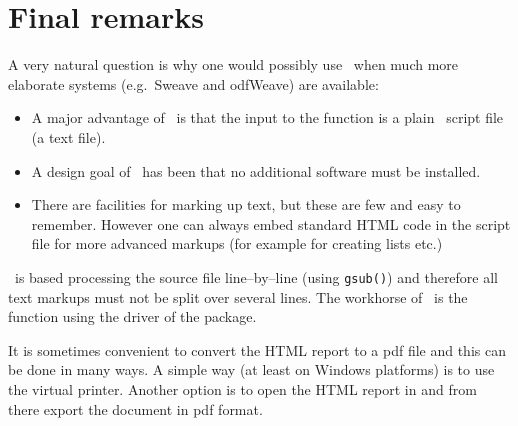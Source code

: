 \documentclass[11pt]{article}
\begin{document}
\section{Final remarks}
\label{sec:xxx}

A very natural question is why one would possibly use \rep\ when much
more elaborate systems (e.g.\ Sweave and odfWeave) are available:

\begin{itemize}
\item A major advantage of \rep\ is that the input to the function is
  a plain \R\ script file (a text file).
\item A design goal of \rep\ has been that no additional software must be
  installed.
\item There are facilities for marking up text, but these are few and
  easy to remember. However one can always embed standard HTML code in
  the script file for more advanced markups (for example for creating
  lists etc.)
\end{itemize}


\rep\ is based processing the source file line--by--line
(using \verb'gsub()') and therefore all text markups must not be split
over several lines.
The workhorse of \rep\ is the  function using the
 driver of the  package.

It is sometimes convenient to convert the HTML report to a pdf file
and this can be done in many ways. A simple way (at least on Windows
platforms) is to use the  virtual printer. Another
option is to open the HTML report in  and from there
export the document in pdf format.


% 
\end{document}
